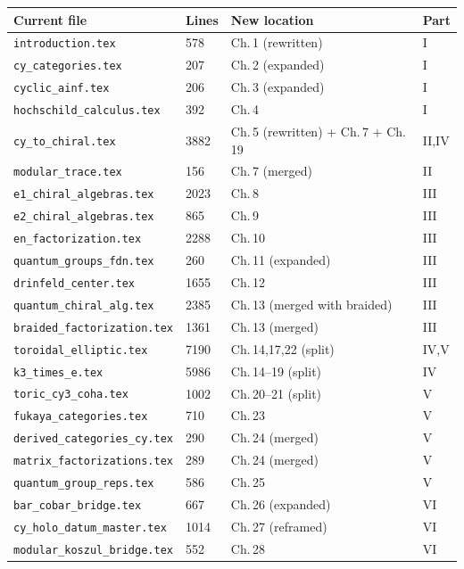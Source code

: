 \documentclass[11pt]{article}
\begin{document}
\begin{longtable}{p{5.5cm}p{1.3cm}p{5.5cm}p{1.3cm}}
\toprule
\textbf{Current file} & \textbf{Lines} & \textbf{New location} & \textbf{Part} \\
\midrule
\endhead
\texttt{introduction.tex} & 578 & Ch.\,1 (rewritten) & I \\
\texttt{cy\_categories.tex} & 207 & Ch.\,2 (expanded) & I \\
\texttt{cyclic\_ainf.tex} & 206 & Ch.\,3 (expanded) & I \\
\texttt{hochschild\_calculus.tex} & 392 & Ch.\,4 & I \\
\texttt{cy\_to\_chiral.tex} & 3882 & Ch.\,5 (rewritten) + Ch.\,7 + Ch.\,19 & II,IV \\
\texttt{modular\_trace.tex} & 156 & Ch.\,7 (merged) & II \\
\texttt{e1\_chiral\_algebras.tex} & 2023 & Ch.\,8 & III \\
\texttt{e2\_chiral\_algebras.tex} & 865 & Ch.\,9 & III \\
\texttt{en\_factorization.tex} & 2288 & Ch.\,10 & III \\
\texttt{quantum\_groups\_fdn.tex} & 260 & Ch.\,11 (expanded) & III \\
\texttt{drinfeld\_center.tex} & 1655 & Ch.\,12 & III \\
\texttt{quantum\_chiral\_alg.tex} & 2385 & Ch.\,13 (merged with braided) & III \\
\texttt{braided\_factorization.tex} & 1361 & Ch.\,13 (merged) & III \\
\texttt{toroidal\_elliptic.tex} & 7190 & Ch.\,14,17,22 (split) & IV,V \\
\texttt{k3\_times\_e.tex} & 5986 & Ch.\,14--19 (split) & IV \\
\texttt{toric\_cy3\_coha.tex} & 1002 & Ch.\,20--21 (split) & V \\
\texttt{fukaya\_categories.tex} & 710 & Ch.\,23 & V \\
\texttt{derived\_categories\_cy.tex} & 290 & Ch.\,24 (merged) & V \\
\texttt{matrix\_factorizations.tex} & 289 & Ch.\,24 (merged) & V \\
\texttt{quantum\_group\_reps.tex} & 586 & Ch.\,25 & V \\
\texttt{bar\_cobar\_bridge.tex} & 667 & Ch.\,26 (expanded) & VI \\
\texttt{cy\_holo\_datum\_master.tex} & 1014 & Ch.\,27 (reframed) & VI \\
\texttt{modular\_koszul\_bridge.tex} & 552 & Ch.\,28 & VI \\

\end{longtable}
\end{document}
